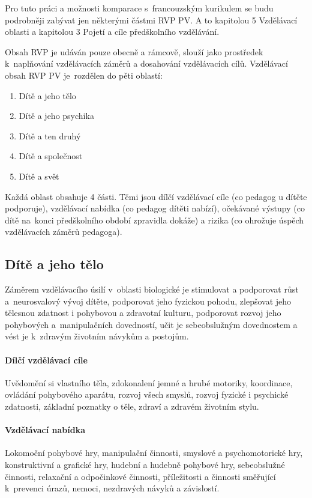 		Pro tuto práci a možnosti komparace s francouzským kurikulem se budu podrobněji zabývat jen některými částmi RVP PV. A to kapitolou 5 Vzdělávací oblasti a kapitolou 3 Pojetí a cíle předškolního vzdělávání.

		Obsah RVP je udáván pouze obecně a rámcově, slouží jako prostředek k naplňování
		vzdělávacích záměrů a dosahování vzdělávacích cílů. Vzdělávací obsah RVP PV je rozdělen do pěti oblastí:

		\begin{enumerate}[1.]
		\item Dítě a jeho tělo
		\item Dítě a jeho psychika
		\item Dítě a ten druhý
		\item Dítě a společnost
		\item Dítě a svět
		\end{enumerate}

		Každá oblast obsahuje 4 části. Těmi jsou dílčí vzdělávací cíle (co pedagog u dítěte podporuje), vzdělávací nabídka (co pedagog dítěti nabízí), očekávané výstupy (co dítě na konci předškolního období zpravidla dokáže) a rizika (co ohrožuje úspěch vzdělávacích záměrů pedagoga).

			\subsection{Dítě a jeho tělo}
				Záměrem vzdělávacího úsilí v oblasti biologické je stimulovat a podporovat růst a neurosvalový vývoj dítěte, podporovat jeho fyzickou pohodu, zlepšovat jeho tělesnou zdatnost i pohybovou a zdravotní kulturu, podporovat rozvoj jeho pohybových a manipulačních dovedností, učit je sebeobslužným dovednostem a vést je k zdravým životním návykům a postojům.

				\paragraph{Dílčí vzdělávací cíle} 
					Uvědomění si vlastního těla, zdokonalení jemné a hrubé motoriky, koordinace, ovládání pohybového aparátu, rozvoj všech smyslů, rozvoj fyzické i psychické zdatnosti, základní poznatky o těle, zdraví a zdravém životním stylu.
				\paragraph{Vzdělávací nabídka}
					Lokomoční pohybové hry, manipulační činnosti, smyslové a psychomotorické hry, konstruktivní a grafické hry, hudební a hudebně pohybové hry, sebeobslužné činnosti, relaxační a odpočinkové činnosti, příležitosti a činnosti směřující k prevenci úrazů, nemoci, nezdravých návyků a závislostí.
